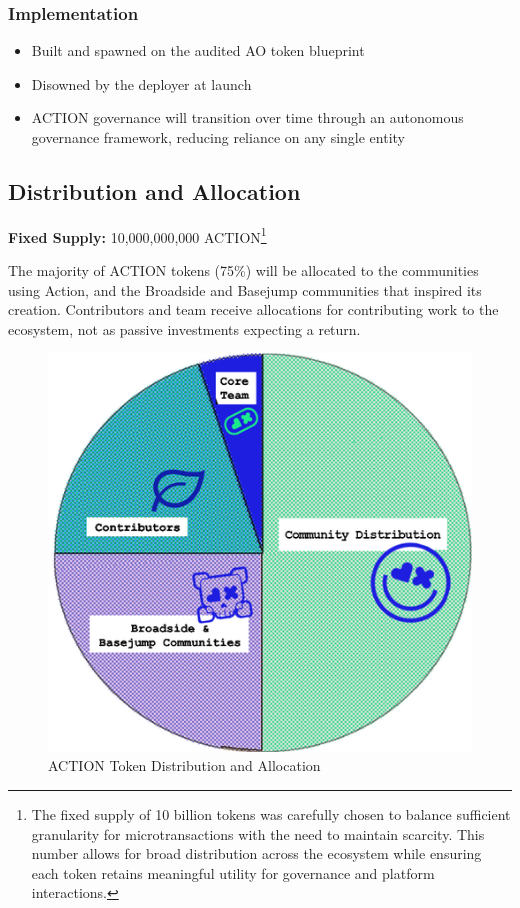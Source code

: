 \subsubsection{Implementation}
\begin{itemize}
\item Built and spawned on the audited AO token blueprint
\item Disowned by the deployer at launch
\item ACTION governance will transition over time through an autonomous governance framework, reducing reliance on any single entity
\end{itemize}

\subsection{Distribution and Allocation}

\textbf{Fixed Supply:} 10,000,000,000 ACTION\footnote{The fixed supply of 10 billion tokens was carefully chosen to balance sufficient granularity for microtransactions with the need to maintain scarcity. This number allows for broad distribution across the ecosystem while ensuring each token retains meaningful utility for governance and platform interactions.}

\vspace{0.5em}

\noindent The majority of ACTION tokens (75\%) will be allocated to the communities using Action, and the Broadside and Basejump communities that inspired its creation. Contributors and team receive allocations for contributing work to the ecosystem, not as passive investments expecting a return.


\begin{figure}
\centering
\includegraphics[width=0.8\columnwidth]{images/image7.png}
\vspace{1em}
\caption{ACTION Token Distribution and Allocation}
\label{fig:token_distribution}
\end{figure}

